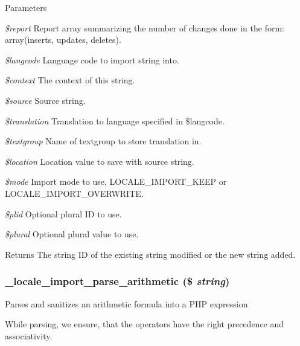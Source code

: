 \begin{DoxyParams}{Parameters}
\item[{\em \$report}]Report array summarizing the number of changes done in the form: array(inserts, updates, deletes). \item[{\em \$langcode}]Language code to import string into. \item[{\em \$context}]The context of this string. \item[{\em \$source}]Source string. \item[{\em \$translation}]Translation to language specified in \$langcode. \item[{\em \$textgroup}]Name of textgroup to store translation in. \item[{\em \$location}]Location value to save with source string. \item[{\em \$mode}]Import mode to use, LOCALE\_\-IMPORT\_\-KEEP or LOCALE\_\-IMPORT\_\-OVERWRITE. \item[{\em \$plid}]Optional plural ID to use. \item[{\em \$plural}]Optional plural value to use.\end{DoxyParams}
\begin{DoxyReturn}{Returns}
The string ID of the existing string modified or the new string added. 
\end{DoxyReturn}
\hypertarget{group__locale_gafec8dc8c1a6f8a0c70b5280c3a520c63}{
\subsubsection[{\_\-locale\_\-import\_\-parse\_\-arithmetic}]{\setlength{\rightskip}{0pt plus 5cm}\_\-locale\_\-import\_\-parse\_\-arithmetic (\$ {\em string})}}
\label{group__locale_gafec8dc8c1a6f8a0c70b5280c3a520c63}
Parses and sanitizes an arithmetic formula into a PHP expression

While parsing, we ensure, that the operators have the right precedence and associativity.


